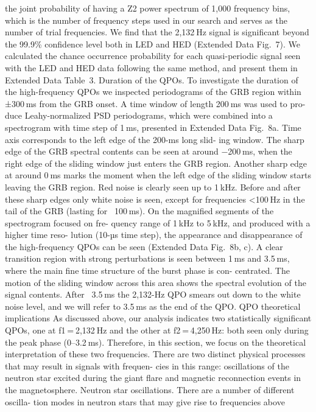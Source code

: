 the joint probability of having a Z2 power spectrum of 1,000 frequency
bins, which is the number of frequency steps used in our search and
serves as the number of trial frequencies. We find that the 2,132 Hz
signal is significant beyond the 99.9\% confidence level both in LED and
HED (Extended Data Fig. 7).
We calculated the chance occurrence probability for each
quasi-periodic signal seen with the LED and HED data following the
same method, and present them in Extended Data Table 3.
Duration of the QPOs. To investigate the duration of the high-frequency
QPOs we inspected periodograms of the GRB region within ±300 ms
from the GRB onset. A time window of length 200 ms was used to pro-
duce Leahy-normalized PSD periodograms, which were combined
into a spectrogram with time step of 1 ms, presented in Extended Data
Fig. 8a. Time axis corresponds to the left edge of the 200-ms long slid-
ing window. The sharp edge of the GRB spectral contents can be seen at
around −200 ms, when the right edge of the sliding window just enters
the GRB region. Another sharp edge at around 0 ms marks the moment
when the left edge of the sliding window starts leaving the GRB region.
Red noise is clearly seen up to 1 kHz. Before and after these sharp edges
only white noise is seen, except for frequencies <100 Hz in the tail of
the GRB (lasting for ~100 ms).
On the magnified segments of the spectrogram focused on fre-
quency range of 1 kHz to 5 kHz, and produced with a higher time reso-
lution (10-µs time step), the appearance and disappearance of the
high-frequency QPOs can be seen (Extended Data Fig. 8b, c). A clear
transition region with strong perturbations is seen between 1 ms and
3.5 ms, where the main fine time structure of the burst phase is con-
centrated. The motion of the sliding window across this area shows
the spectral evolution of the signal contents. After ~3.5 ms the 2,132-Hz
QPO smears out down to the white noise level, and we will refer to 3.5 ms
as the end of the QPO.
QPO theoretical implications
As discussed above, our analysis indicates two statistically significant
QPOs, one at f1 = 2,132 Hz and the other at f2 = 4,250 Hz: both seen only
during the peak phase (0–3.2 ms). Therefore, in this section, we focus
on the theoretical interpretation of these two frequencies. There are
two distinct physical processes that may result in signals with frequen-
cies in this range: oscillations of the neutron star excited during the
giant flare and magnetic reconnection events in the magnetosphere.
Neutron star oscillations. There are a number of different oscilla-
tion modes in neutron stars that may give rise to frequencies above
